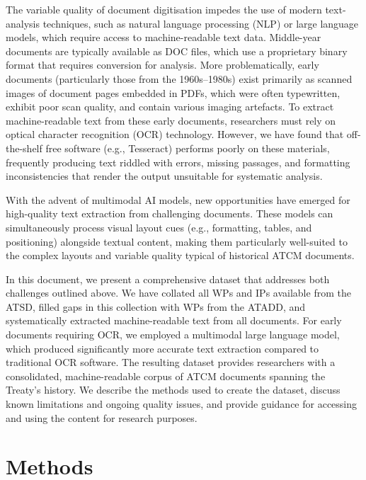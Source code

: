 \documentclass[12pt]{article}
\begin{document}
The variable quality of document digitisation 
impedes the use of modern text-analysis techniques,
such as natural language processing (NLP) or large language models,
which require access to machine-readable text data. 
Middle-year documents are typically available as DOC files, which use a proprietary binary format that requires conversion for analysis. 
More problematically, early documents 
(particularly those from the 1960s--1980s)
exist primarily as scanned images of document pages embedded in PDFs,
which were often typewritten,
exhibit poor scan quality, 
and contain various imaging artefacts.
To extract machine-readable text from these early documents, researchers must rely on optical character recognition (OCR) technology. 
However, we have found that off-the-shelf free software (e.g., Tesseract) 
performs poorly on these materials, 
frequently producing text riddled with errors, missing passages, and formatting inconsistencies 
that render the output unsuitable for systematic analysis.

With the advent of multimodal AI models,
new opportunities have emerged for high-quality text extraction from challenging documents. 
These models can simultaneously process visual layout cues (e.g., formatting, tables, and positioning) alongside textual content, 
making them particularly well-suited to the complex layouts and variable quality typical of historical ATCM documents.

In this document, we present a comprehensive dataset that addresses both challenges outlined above. 
We have collated all WPs and IPs available from the ATSD, 
filled gaps in this collection with WPs from the ATADD, 
and systematically extracted machine-readable text from all documents. 
For early documents requiring OCR, we employed a multimodal large language model, 
which produced significantly more accurate text extraction compared to traditional OCR software. 
The resulting dataset provides researchers with a consolidated, machine-readable corpus of ATCM documents spanning the Treaty's history.
%
We describe the methods used to create the dataset, 
discuss known limitations and ongoing quality issues, 
and provide guidance for accessing and using the content for research purposes.

\section{Methods}
\end{document}
